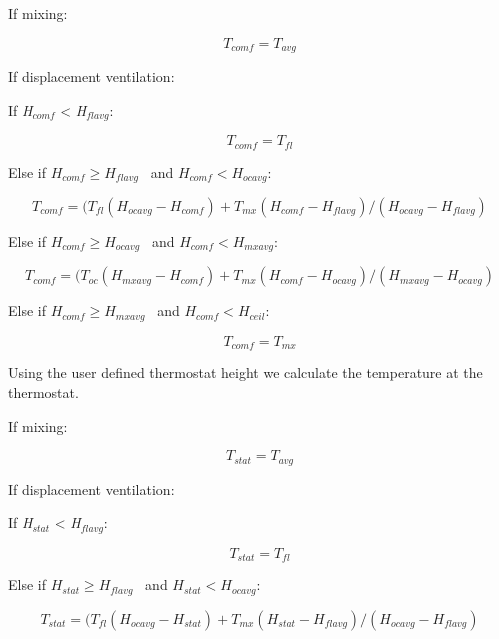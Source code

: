 {If mixing:

\begin{equation}
{T_{comf}} = {T_{avg}}
\end{equation}

If displacement ventilation:

If \emph{H\(_{comf}\)} \textless{} \emph{H\(_{flavg}\)}:

\begin{equation}
{T_{comf}} = {T_{fl}}
\end{equation}

Else if \({H_{comf}} \ge {H_{flavg}}\) ~and \({H_{comf}} < {H_{ocavg}}\):

\begin{equation}
{T_{comf}} = ({T_{fl}}({H_{ocavg}} - {H_{comf}}) + {T_{mx}}({H_{comf}} - {H_{flavg}})/({H_{ocavg}} - {H_{flavg}})
\end{equation}

Else if \({H_{comf}} \ge {H_{ocavg}}\) ~and \({H_{comf}} < {H_{mxavg}}\):

\begin{equation}
{T_{comf}} = ({T_{oc}}({H_{mxavg}} - {H_{comf}}) + {T_{mx}}({H_{comf}} - {H_{ocavg}})/({H_{mxavg}} - {H_{ocavg}})
\end{equation}

Else if \({H_{comf}} \ge {H_{mxavg}}\) ~and \({H_{comf}} < {H_{ceil}}\):

\begin{equation}
{T_{comf}} = {T_{mx}}
\end{equation}

Using the user defined thermostat height we calculate the temperature at the thermostat.

If mixing:

\begin{equation}
{T_{stat}} = {T_{avg}}
\end{equation}

If displacement ventilation:

If \emph{H\(_{stat}\)} \textless{} \emph{H\(_{flavg}\)}:

\begin{equation}
{T_{stat}} = {T_{fl}}
\end{equation}

Else if \({H_{stat}} \ge {H_{flavg}}\) ~and \({H_{stat}} < {H_{ocavg}}\):

\begin{equation}
{T_{stat}} = ({T_{fl}}({H_{ocavg}} - {H_{stat}}) + {T_{mx}}({H_{stat}} - {H_{flavg}})/({H_{ocavg}} - {H_{flavg}})
\end{equation}

}

